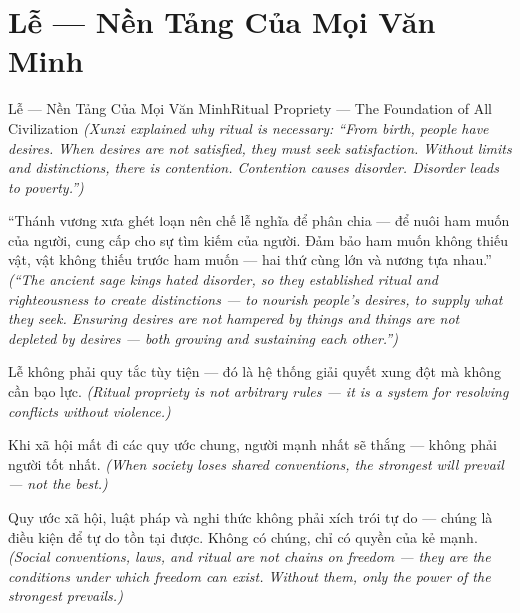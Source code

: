 \section{Lễ — Nền Tảng Của Mọi Văn Minh}
\begin{truyen}{Lễ — Nền Tảng Của Mọi Văn Minh}{Ritual Propriety — The Foundation of All Civilization}
\textit{(Xunzi explained why ritual is necessary: ``From birth, people have desires. When desires are not satisfied, they must seek satisfaction. Without limits and distinctions, there is contention. Contention causes disorder. Disorder leads to poverty.'')}

``Thánh vương xưa ghét loạn nên chế lễ nghĩa để phân chia — để nuôi ham muốn của người, cung cấp cho sự tìm kiếm của người. Đảm bảo ham muốn không thiếu vật, vật không thiếu trước ham muốn — hai thứ cùng lớn và nương tựa nhau.''
\textit{(``The ancient sage kings hated disorder, so they established ritual and righteousness to create distinctions — to nourish people's desires, to supply what they seek. Ensuring desires are not hampered by things and things are not depleted by desires — both growing and sustaining each other.'')}

Lễ không phải quy tắc tùy tiện — đó là hệ thống giải quyết xung đột mà không cần bạo lực.
\textit{(Ritual propriety is not arbitrary rules — it is a system for resolving conflicts without violence.)}

Khi xã hội mất đi các quy ước chung, người mạnh nhất sẽ thắng — không phải người tốt nhất.
\textit{(When society loses shared conventions, the strongest will prevail — not the best.)}

\end{truyen}

\begin{baihoc}
Quy ước xã hội, luật pháp và nghi thức không phải xích trói tự do — chúng là điều kiện để tự do tồn tại được. Không có chúng, chỉ có quyền của kẻ mạnh.
\textit{(Social conventions, laws, and ritual are not chains on freedom — they are the conditions under which freedom can exist. Without them, only the power of the strongest prevails.)}
\end{baihoc}
\ngancach

